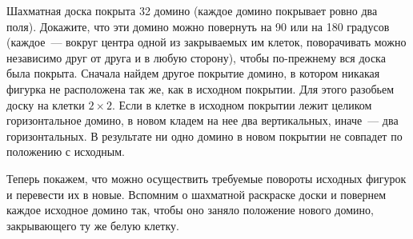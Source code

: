 \problem
Шахматная доска покрыта 32 домино (каждое домино покрывает ровно два поля).
Докажите, что эти домино можно повернуть на 90 или на 180 градусов
(каждое~--- вокруг центра одной из закрываемых им клеток, поворачивать можно
независимо друг от друга и в любую сторону), чтобы по-прежнему вся доска была
покрыта.
\solution
Сначала найдем другое покрытие домино, в котором никакая фигурка не расположена
так же, как в исходном покрытии.
Для этого разобьем доску на клетки $2 \times 2$.
Если в клетке в исходном покрытии лежит целиком горизонтальное домино, в новом
кладем на нее два вертикальных, иначе~--- два горизонтальных.
В результате ни одно домино в новом покрытии не совпадет по положению с
исходным.
\par
Теперь покажем, что можно осуществить требуемые повороты исходных фигурок и
перевести их в новые.
Вспомним о шахматной раскраске доски и повернем каждое исходное домино
так, чтобы оно заняло положение нового домино, закрывающего ту же белую
клетку.
\endproblem

